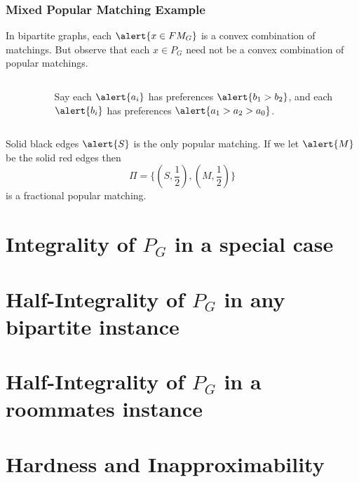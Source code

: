 \documentclass[10pt]{beamer}
\begin{document}
\begin{frame}
\frametitle{Mixed Popular Matching Example}
In bipartite graphs, each $\alert{x \in FM_G}$ is a convex combination of matchings. But observe that each $x\in P_G$ need not be a convex combination of popular matchings.
\begin{columns}[T] %
\begin{column}{.48\textwidth}
\begin{figure}
\end{figure}
\end{column}%
\hfill%
\begin{column}{.48\textwidth}
$$ $$
Say each $\alert{a_i}$ has preferences $\alert{b_1 > b_2}$, and each $\alert{b_i}$ has preferences $\alert{a_1 > a_2 > a_0}$.
\end{column}%
\end{columns}


Solid black edges $\alert{S}$ is the only popular matching. If we let $\alert{M}$ be the solid red edges then $$\Pi= \{(S,\frac{1}{2}), (M,\frac{1}{2})\}$$ is a fractional popular matching.
\end{frame}
\section{Integrality of $P_G$ in a special case}

\section{Half-Integrality of $P_G$ in any bipartite instance}
\section{Half-Integrality of $P_G$ in a roommates instance}

\section{Hardness and Inapproximability}
\end{document}
